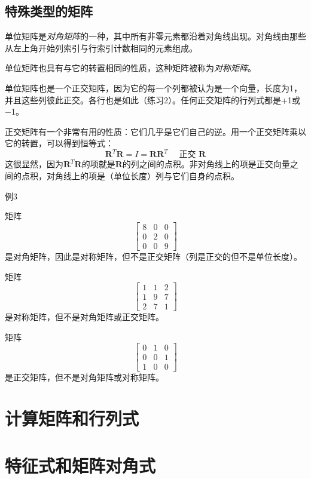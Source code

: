 \documentclass[lang=cn,12pt]{elegantbook}
\begin{document}
\subsection{特殊类型的矩阵}

单位矩阵是\textit{对角矩阵}的一种，其中所有非零元素都沿着对角线出现。对角线由那些从左上角开始列索引与行索引计数相同的元素组成。

单位矩阵也具有与它的转置相同的性质，这种矩阵被称为\textit{对称矩阵}。

单位矩阵也是一个正交矩阵，因为它的每一个列都被认为是一个向量，长度为1，并且这些列彼此正交。各行也是如此（练习2）。任何正交矩阵的行列式都是+1或−1。


正交矩阵有一个非常有用的性质：它们几乎是它们自己的逆。用一个正交矩阵乘以它的转置，可以得到恒等式：$$\mathbf{R}^T \mathbf{R}=I=\mathbf{R} \mathbf{R}^T \quad \text { 正交 } \mathbf{R}$$这很显然，因为$\mathbf{R}^T \mathbf{R}$的项就是$\mathbf{R}$的列之间的点积。非对角线上的项是正交向量之间的点积，对角线上的项是（单位长度）列与它们自身的点积。

例3

矩阵
$$
\left[\begin{array}{lll}
8 & 0 & 0 \\
0 & 2 & 0 \\
0 & 0 & 9
\end{array}\right]
$$
是对角矩阵，因此是对称矩阵，但不是正交矩阵（列是正交的但不是单位长度）。

矩阵
$$
\left[\begin{array}{lll}
1 & 1 & 2 \\
1 & 9 & 7 \\
2 & 7 & 1
\end{array}\right]
$$是对称矩阵，但不是对角矩阵或正交矩阵。

矩阵
$$
\left[\begin{array}{lll}
0 & 1 & 0 \\
0 & 0 & 1 \\
1 & 0 & 0
\end{array}\right]
$$
是正交矩阵，但不是对角矩阵或对称矩阵。

\section{计算矩阵和行列式}
\section{特征式和矩阵对角式}
\end{document}
